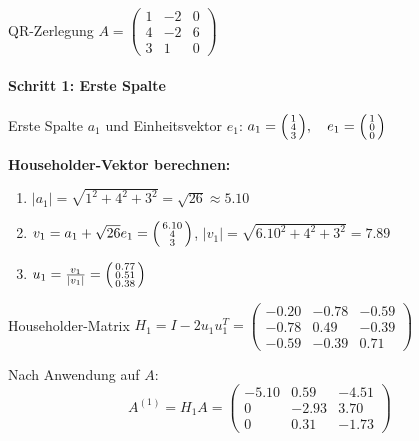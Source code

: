 \begin{example2}[breakable]{QR-Zerlegung}
$A = \begin{pmatrix}
1 & -2 & 0\\
4 & -2 & 6\\
3 & 1 & 0
\end{pmatrix}$

\paragraph{Schritt 1: Erste Spalte}
Erste Spalte $a_1$ und Einheitsvektor $e_1$:
$a_1 = \begin{psmallmatrix} 1\\ 4\\ 3 \end{psmallmatrix}, \quad e_1 = \begin{psmallmatrix} 1\\ 0\\ 0 \end{psmallmatrix}$

\textbf{Householder-Vektor berechnen:}
\vspace{1mm}
\begin{enumerate}
    \item $|a_1| = \sqrt{1^2 + 4^2 + 3^2} = \sqrt{26} \approx 5.10$
    \item $v_1 = a_1 + \sqrt{26}e_1 = \begin{psmallmatrix} 6.10\\ 4\\ 3 \end{psmallmatrix}$,
    $|v_1| = \sqrt{6.10^2 + 4^2 + 3^2} = 7.89$
    \item $u_1 = \frac{v_1}{|v_1|} = \begin{psmallmatrix} 0.77\\ 0.51\\ 0.38 \end{psmallmatrix}$
\end{enumerate}

Householder-Matrix $H_1 = I - 2u_1u_1^T = \begin{pmatrix}
-0.20 & -0.78 & -0.59\\
-0.78 & 0.49 & -0.39\\
-0.59 & -0.39 & 0.71
\end{pmatrix}$

Nach Anwendung auf $A$:
\vspace{-3mm}
$$A^{(1)} = H_1A = \begin{pmatrix}
-5.10 & 0.59 & -4.51\\
0 & -2.93 & 3.70\\
0 & 0.31 & -1.73
\end{pmatrix}$$


\end{example2}
